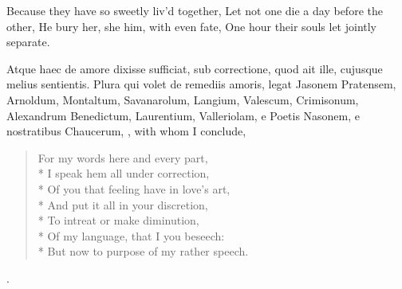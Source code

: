 {Because they have so sweetly liv'd together,
Let not one die a day before the other,
He bury her, she him, with even fate,
One hour their souls let jointly separate.


Atque haec de amore dixisse sufficiat, sub correctione, quod ait
ille, cujusque melius sentientis. Plura qui volet de remediis amoris,
legat Jasonem Pratensem, Arnoldum, Montaltum, Savanarolum, Langium,
Valescum, Crimisonum, Alexandrum Benedictum, Laurentium, Valleriolam, e
Poetis Nasonem, e nostratibus Chaucerum, \etc{}, with whom I conclude,

{\gothfont
{}
\begin{verse}
For my words here and every part,\\*
I speak hem all under correction,\\*
Of you that feeling have in love's art,\\*
And put it all in your discretion,\\*
To intreat or make diminution,\\*
Of my language, that I you beseech:\\*
But now to purpose of my rather speech.
\end{verse}
}
\etc{}.
}

